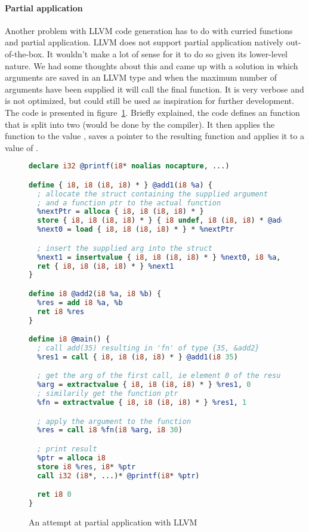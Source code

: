 \paragraph{Partial application}
Another problem with LLVM code generation has to do with curried functions and partial application. LLVM does not support partial application natively out-of-the-box. It wouldn't make a lot of sense for it to do so given its lower-level nature. We had some thoughts about this and came up with a solution in which arguments are saved in an LLVM  type and when the maximum number of arguments have been supplied it will call the final function. It is very verbose and is not optimized, but could still be used as inspiration for further development. The code is presented in figure~\ref{fig:llvm-partial}. Briefly explained, the code defines an  function that is split into two (would be done by the compiler). It then applies the function to the value , saves a pointer to the resulting function and applies it to a value of .

\begin{figure}[p]
\begin{lstlisting}[language=llvm]
declare i32 @printf(i8* noalias nocapture, ...)

define { i8, i8 (i8, i8) * } @add1(i8 %a) {
  ; allocate the struct containing the supplied argument
  ; and a function ptr to the actual function
  %nextPtr = alloca { i8, i8 (i8, i8) * }
  store { i8, i8 (i8, i8) * } { i8 undef, i8 (i8, i8) * @add2 }, { i8, i8 (i8, i8) * } * %nextPtr
  %next0 = load { i8, i8 (i8, i8) * } * %nextPtr

  ; insert the supplied arg into the struct
  %next1 = insertvalue { i8, i8 (i8, i8) * } %next0, i8 %a, 0
  ret { i8, i8 (i8, i8) * } %next1
}

define i8 @add2(i8 %a, i8 %b) {
  %res = add i8 %a, %b
  ret i8 %res
}

define i8 @main() {
  ; call add(35) resulting in 'fn' of type {35, &add2}
  %res1 = call { i8, i8 (i8, i8) * } @add1(i8 35)

  ; get the arg of the first call, ie element 0 of the resulting struct
  %arg = extractvalue { i8, i8 (i8, i8) * } %res1, 0
  ; similarily get the function ptr
  %fn = extractvalue { i8, i8 (i8, i8) * } %res1, 1

  ; apply the argument to the function
  %res = call i8 %fn(i8 %arg, i8 30)

  ; print result
  %ptr = alloca i8
  store i8 %res, i8* %ptr
  call i32 (i8*, ...)* @printf(i8* %ptr)

  ret i8 0
}
\end{lstlisting}
\caption{An attempt at partial application with LLVM}
\label{fig:llvm-partial}
\end{figure}


